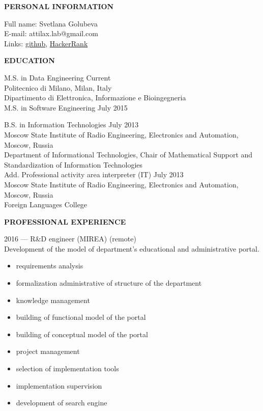 \documentclass[a4paper,12pt,fullpage]{article}
\begin{document}
\begin{center}
	\textbf{PERSONAL INFORMATION\\}
\end{center}

Full name: \hfill Svetlana Golubeva\\
E-mail: \hfill attilax.lab@gmail.com \\
Links: \hfill  \href{https://github.com/attillax}{github}, 
\href{https://www.hackerrank.com/attillax}{HackerRank}\\

\begin{center}
	\textbf{EDUCATION}
\end{center}	

M.S. in Data Engineering \hfill Current\\
Politecnico di Milano, Milan, Italy\\
Dipartimento di Elettronica, Informazione e Bioingegneria\\

M.S. in Software Engineering \hfill July 2015

B.S. in Information Technologies \hfill July 2013\\
Moscow State Institute of Radio Engineering, Electronics and Automation, Moscow, Russia\\
Department of Informational Technologies, Chair of Mathematical Support and Standardization of Information Technologies\\

Add. Professional activity area interpreter (IT) \hfill July 2013\\
Moscow State Institute of Radio Engineering, Electronics and Automation, Moscow, Russia\\
Foreign Languages College\\

\begin{center}
	\textbf{PROFESSIONAL EXPERIENCE}
\end{center}	

2016 --- R\&D engineer (MIREA) (remote)\\
Development of the model of department's educational and administrative portal.
\begin{itemize}
	\item requirements analysis
	\item formalization administrative of structure of the department
	\item knowledge management
	\item building of functional model of the portal
	\item building of conceptual model of the portal
	\item project management
	\item selection of implementation tools
	\item implementation supervision
	\item development of search engine
\end{itemize}
\end{document}

